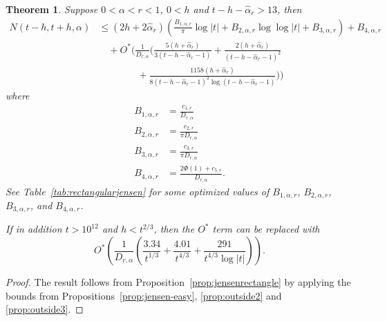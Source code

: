\documentclass[10pt,english,letter, reqno]{amsart}
\newcommand{\Ostar}{O^{\ast}}
\theoremstyle{plain}
\newtheorem{theorem}{Theorem}
\theoremstyle{definition}
\begin{document}
\begin{theorem}\label{thm:rectangularjensen}
Suppose $0<\alpha<r<1$, $0<h$ and $t-h-\hat{\alpha}_r>13$,  then
\begin{align*} N(t-h,t+h,\alpha) &\leq  (2h+2\hat{\alpha}_r)\left(\frac{B_{1,\alpha,r}}{\pi} \log|t|
+ B_{2,\alpha,r}\log\log|t| +  B_{3,\alpha,r} \right) + B_{4,\alpha,r} \\&\quad+ \Ostar\!\biggl(\frac{1}{D_{r,\alpha}}\biggl(\frac{5(h+\hat{\alpha}_r)}{3(t-h-\hat{\alpha}_r-1)} + \frac{2(h+\hat{\alpha}_r)}{(t-h-\hat{\alpha}_r-1)^2} \\&\qquad\qquad+ \frac{1158(h+\hat{\alpha}_r)}{8(t-h-\hat{\alpha}_r-1)^2\log(t-h-\hat{\alpha}_r-1)}\biggr)\biggr)
\end{align*}
where
\begin{align*}
    B_{1,\alpha,r} &= \frac{c_{1,r}}{ D_{r,\alpha}}\\
    B_{2,\alpha,r} &= \frac{c_{2,r}}{ \pi  D_{r,\alpha}}\\
    B_{3,\alpha,r} &= \frac{c_{3,r}}{  \pi  D_{r,\alpha}} \\
    B_{4,\alpha,r} &= \frac{ 2\Phi(1) + c_{5,r}}{ D_{r,\alpha}}.
\end{align*}
See Table~\ref{tab:rectangularjensen} for some optimized values of $B_{1,\alpha,r}$, $B_{2,\alpha,r}$, $B_{3,\alpha,r}$, and $B_{4,\alpha,r}$.

If in addition $t>10^{12}$ and $h<t^{2/3}$, then the $\Ostar$ term can be replaced with
\[
\Ostar\!\left(\frac{1}{D_{r,\alpha}}\left(\frac{3.34}{t^{1/3}} + \frac{4.01}{t^{4/3}} + \frac{291}{t^{4/3}\log|t|}\right)\right).
\]
\end{theorem}
\begin{proof}
The result follows from 
Proposition~\ref{prop:jensenrectangle} by applying the bounds from Propositions~\ref{prop:jensen-easy}, \ref{prop:outside2} and \ref{prop:outside3}.
\end{proof}
\end{document}
